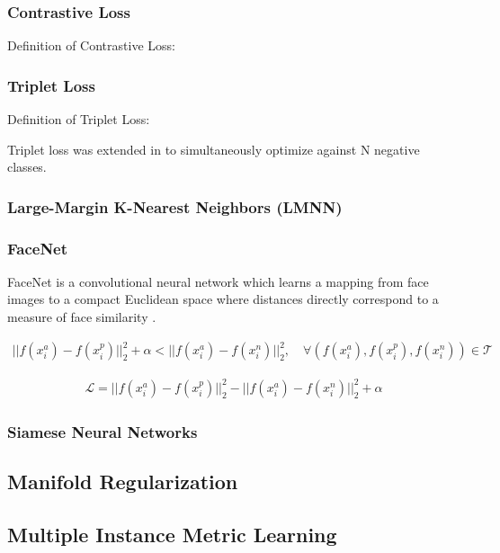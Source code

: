 	\subsubsection{Contrastive Loss}
	Definition of Contrastive Loss:
	
	
	\subsubsection{Triplet Loss}
	
	Definition of Triplet Loss:
	
	Triplet loss was extended in \cite{Sohn2016NPairLoss} to simultaneously optimize against N negative classes.

		\subsubsection{Large-Margin K-Nearest Neighbors (LMNN)}
		
		\subsubsection{FaceNet}
		
		FaceNet is a convolutional neural network which learns a mapping from face images to a compact Euclidean space where distances directly correspond to a measure of face similarity \cite{Schroff2015FaceNet}. 
		
		\begin{align}
			||f(x^{a}_{i}) - f(x^{p}_{i})||^{2}_{2} + \alpha < ||f(x^{a}_{i}) - f(x^{n}_{i})||^{2}_{2}, \quad \forall (f(x^{a}_{i}),f(x^{p}_{i}),f(x^{n}_{i})) \in \mathcal{T}
		\end{align} 
	
		\begin{align}
			\mathcal{L} = ||f(x^{a}_{i}) - f(x^{p}_{i})||^{2}_{2} -||f(x^{a}_{i}) - f(x^{n}_{i})||^{2}_{2} + \alpha
		\end{align}
		
		
		\subsubsection{Siamese Neural Networks}
	
	\subsection{Manifold Regularization}
	
	\subsection{Multiple Instance Metric Learning}



